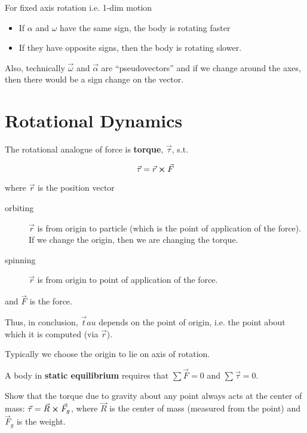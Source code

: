 \begin{remark}
	For fixed axis rotation i.e. 1-dim motion

	\begin{itemize}
		\item If $\alpha$ and $\omega$ have the same sign, the body is rotating faster
		\item If they have opposite signs, then the body is rotating slower.
	\end{itemize}

	Also, technically $\vec\omega$ and $\vec\alpha$ are ``pseudovectors'' and if we change around the axes, then there would be a sign change on the vector.
\end{remark}

\section{Rotational Dynamics}

The rotational analogue of force is \textbf{torque}, $\vec\tau$, s.t.

\begin{equation}
	\vec \tau = \vec r \cross \vec F
\end{equation}

where $\vec r$ is the position vector

\begin{description}
	\item[orbiting] $\vec r$ is from origin to particle (which is the point of application of the force). If we change the origin, then we are changing the torque.
	\item[spinning] $\vec r$ is from origin to point of application of the force. 
\end{description}

and $\vec F$ is the force.

Thus, in conclusion, $\vec tau$ depends on the point of origin, i.e. the point about which it is computed (via $\vec r$).

Typically we choose the origin to lie on axis of rotation.

A body in \textbf{static equilibrium} requires that $\sum \vec F = 0$ and $\sum \vec\tau = 0$.

\begin{example}
	Show that the torque due to gravity about any point always acts at the center of mass: $\vec \tau = \vec R \cross \vec F_g$, where $\vec R$ is the center of mass (measured from the point) and $\vec F_g$ is the weight.
\end{example}

